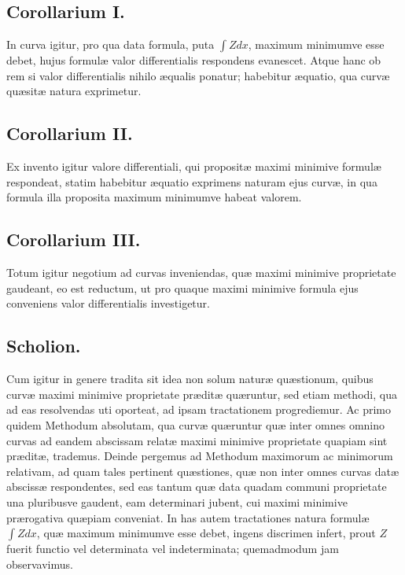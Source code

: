 \subsection*{Corollarium I.}
In curva igitur, pro qua data formula, puta $\int Zdx$, maximum minimumve esse debet, hujus formulæ valor differentialis respondens evanescet. Atque hanc ob rem si valor differentialis nihilo æqualis ponatur; habebitur æquatio, qua curvæ quæsitæ natura exprimetur.

\subsection*{Corollarium II.}
Ex invento igitur valore differentiali, qui propositæ maximi minimive formulæ respondeat, statim habebitur æquatio exprimens naturam ejus curvæ, in qua formula illa proposita maximum minimumve habeat valorem.

\subsection*{Corollarium III.}
Totum igitur negotium ad curvas inveniendas, quæ maximi minimive proprietate gaudeant, eo est reductum, ut pro quaque maximi minimive formula ejus conveniens valor differentialis investigetur.

\subsection*{Scholion.}
Cum igitur in genere tradita sit idea non solum naturæ quæstionum, quibus curvæ maximi minimive proprietate præditæ quæruntur, sed etiam methodi, qua ad eas resolvendas uti oporteat, ad ipsam tractationem progrediemur. Ac primo quidem Methodum absolutam, qua curvæ quæruntur quæ inter omnes omnino curvas ad eandem abscissam relatæ maximi minimive proprietate quapiam sint præditæ, trademus. Deinde pergemus ad Methodum maximorum ac minimorum relativam, ad quam tales pertinent quæstiones, quæ non inter omnes curvas datæ abscissæ respondentes, sed eas tantum quæ data quadam communi proprietate una pluribusve gaudent, eam determinari jubent, cui maximi minimive prærogativa quæpiam conveniat. In has autem tractationes natura formulæ $\int Zdx$, quæ maximum minimumve esse debet, ingens discrimen infert, prout $Z$ fuerit functio vel determinata vel indeterminata; quemadmodum jam observavimus.
